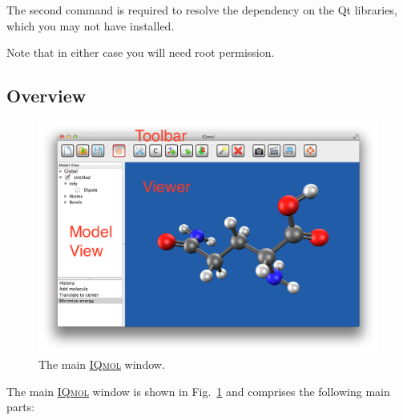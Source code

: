 \documentclass[a4paper,12pt]{article}
\newcommand{\iqmol}{\href{http://iqmol.org}{{\scshape IQmol}}}
\begin{document}
The second command is required to resolve the dependency on the Qt libraries,
which you may not have installed.

\hspace*{2em}{\tt \#>  sudo yum install iqmol-2.9.9-2.x86\_64.rpm}

Note that in either case you will need root permission.


\subsection{Overview}
\label{sec:overview}

\begin{figure}[ht]
\begin{center}
\includegraphics[scale=0.35]{figures/Viewer.png}
\caption{The main \iqmol{} window.}
\label{fig:main}
\end{center}
\end{figure}
The main \iqmol{} window is shown in Fig.~\ref{fig:main} and comprises the
following main parts:
\end{document}
